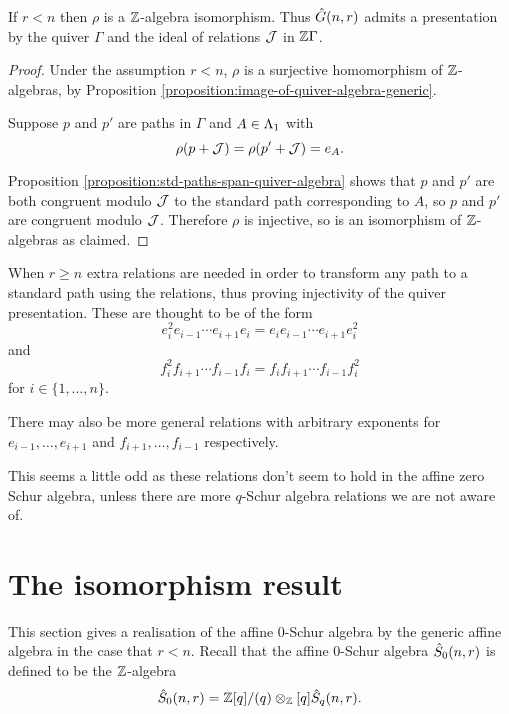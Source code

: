 \documentclass[a4paper, 11pt]{report}
\begin{document}
\begin{theorem}\label{theorem:presentation-generic-algebra}
If $r<n$ then $\rho$ is a $\mathbb{Z}$-algebra isomorphism. Thus $\hat{G}(n,r)$ admits a presentation by the quiver $\Gamma$ and the ideal of relations $\mathcal{J}$ in $\mathbb{Z}\Gamma$.
\end{theorem}

\begin{proof}
Under the assumption $r<n$, $\rho$ is a surjective homomorphism of $\mathbb{Z}$-algebras, by Proposition \ref{proposition:image-of-quiver-algebra-generic}.

Suppose $p$ and $p'$ are paths in $\Gamma$ and $A\in\Lambda_1{}$ with
\begin{equation*}
\rho(p+\mathcal{J}) = \rho(p'+\mathcal{J}) = e_A.
\end{equation*}

Proposition \ref{proposition:std-paths-span-quiver-algebra} shows that $p$ and $p'$ are both congruent modulo $\mathcal{J}$ to the standard path corresponding to $A$, so $p$ and $p'$ are congruent modulo $\mathcal{J}$. Therefore $\rho$ is injective, so is an isomorphism of $\mathbb{Z}$-algebras as claimed. 
\end{proof}

{\color{red}When $r\geq n$ extra relations are needed in order to transform any path to a standard path using the relations, thus proving injectivity of the quiver presentation. These are thought to be of the form
\begin{equation*}
e_i^2e_{i-1}\cdots e_{i+1}e_i = e_ie_{i-1}\cdots e_{i+1}e_i^2
\end{equation*}
and
\begin{equation*}
f_i^2f_{i+1}\cdots f_{i-1}f_i = f_if_{i+1}\cdots f_{i-1}f_i^2
\end{equation*}
for $i\in\{1,\ldots,n\}$.

There may also be more general relations with arbitrary exponents for $e_{i-1},\ldots,e_{i+1}$ and $f_{i+1},\ldots,f_{i-1}$ respectively.

This seems a little odd as these relations don't seem to hold in the affine zero Schur algebra, unless there are more $q$-Schur algebra relations we are not aware of.
}


\section{The isomorphism result}

This section gives a realisation of the affine $0$-Schur algebra by the generic affine algebra in the case that $r<n$. Recall that the affine $0$-Schur algebra $\hat{S}_0(n,r)$ is defined to be the $\mathbb{Z}$-algebra
\begin{equation*}
\hat{S}_0(n,r) = \mathbb{Z}[q]/{(q)}\otimes_{\mathbb{Z}}[q]\hat{S}_q(n,r).
\end{equation*}
\end{document}
